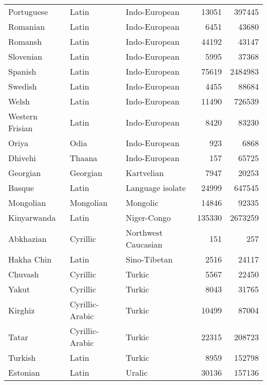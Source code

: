 \begin{table}[H]
\begin{tabular}{lllrr}
  Portuguese & Latin & Indo-European & 13051 & 397445 \\ 
  Romanian & Latin & Indo-European & 6451 & 43680 \\ 
  Romansh & Latin & Indo-European & 44192 & 43147 \\ 
  Slovenian & Latin & Indo-European & 5995 & 37368 \\ 
  Spanish & Latin & Indo-European & 75619 & 2484983 \\ 
  Swedish & Latin & Indo-European & 4455 & 88684 \\ 
  Welsh & Latin & Indo-European & 11490 & 726539 \\ 
  Western Frisian & Latin & Indo-European & 8420 & 83230 \\ 
  Oriya & Odia & Indo-European & 923 & 6868 \\ 
  Dhivehi & Thaana & Indo-European & 157 & 65725 \\ 
  Georgian & Georgian & Kartvelian & 7947 & 20253 \\ 
  Basque & Latin & Language isolate & 24999 & 647545 \\ 
  Mongolian & Mongolian & Mongolic & 14846 & 92335 \\ 
  Kinyarwanda & Latin & Niger-Congo & 135330 & 2673259 \\ 
  Abkhazian & Cyrillic & Northwest Caucasian & 151 & 257 \\ 
  Hakha Chin & Latin & Sino-Tibetan & 2516 & 24117 \\ 
  Chuvash & Cyrillic & Turkic & 5567 & 22450 \\ 
  Yakut & Cyrillic & Turkic & 8043 & 31765 \\ 
  Kirghiz & Cyrillic-Arabic & Turkic & 10499 & 87004 \\ 
  Tatar & Cyrillic-Arabic & Turkic & 22315 & 208723 \\ 
  Turkish & Latin & Turkic & 8959 & 152798 \\ 
  Estonian & Latin & Uralic & 30136 & 157136 \\ 
   \hline
\end{tabular}
\end{table}
